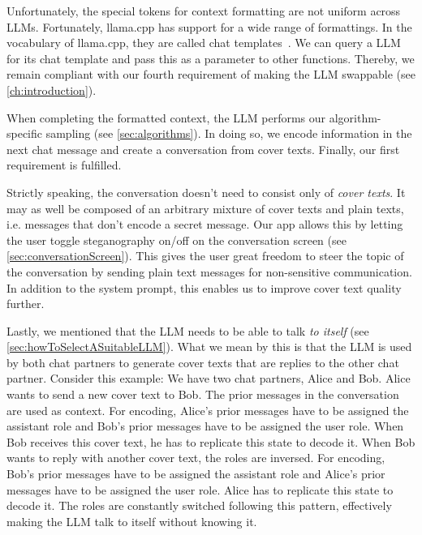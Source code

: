 Unfortunately, the special tokens for context formatting are not uniform across \glspl{LLM}. Fortunately, llama.cpp has support for a wide range of formattings. In the vocabulary of llama.cpp, they are called chat templates~\cite{gerganovGgerganovLlamacpp2024,jiangChatBugCommonVulnerability2025}. We can query a \gls{LLM} for its chat template and pass this as a parameter to other functions. Thereby, we remain compliant with our fourth requirement of making the \gls{LLM} swappable (see \cref{ch:introduction}).

When completing the formatted context, the \gls{LLM} performs our algorithm-specific sampling (see \cref{sec:algorithms}). In doing so, we encode information in the next chat message and create a conversation from cover texts. Finally, our first requirement is fulfilled.

Strictly speaking, the conversation doesn't need to consist only of \textit{cover texts}. It may as well be composed of an arbitrary mixture of cover texts and plain texts, i.e. messages that don't encode a secret message. Our app allows this by letting the user toggle steganography on/off on the conversation screen (see \cref{sec:conversationScreen}). This gives the user great freedom to steer the topic of the conversation by sending plain text messages for non-sensitive communication. In addition to the system prompt, this enables us to improve cover text quality further.

Lastly, we mentioned that the \gls{LLM} needs to be able to talk \textit{to itself} (see \cref{sec:howToSelectASuitableLLM}). What we mean by this is that the \gls{LLM} is used by both chat partners to generate cover texts that are replies to the other chat partner. Consider this example: We have two chat partners, Alice and Bob. Alice wants to send a new cover text to Bob. The prior messages in the conversation are used as context. For encoding, Alice's prior messages have to be assigned the assistant role and Bob's prior messages have to be assigned the user role. When Bob receives this cover text, he has to replicate this state to decode it. When Bob wants to reply with another cover text, the roles are inversed. For encoding, Bob's prior messages have to be assigned the assistant role and Alice's prior messages have to be assigned the user role. Alice has to replicate this state to decode it. The roles are constantly switched following this pattern, effectively making the \gls{LLM} talk to itself without knowing it.


